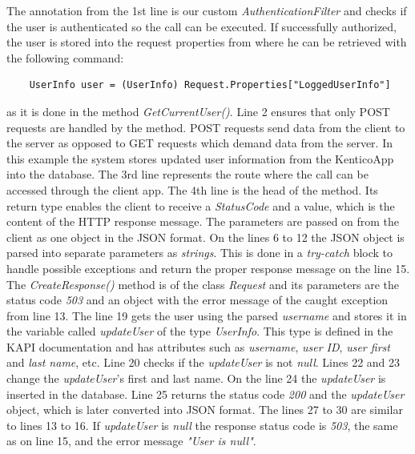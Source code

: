 The annotation from the 1st line is our custom \textit{AuthenticationFilter} and checks if the user is authenticated so the call can be executed. If successfully authorized, the user is stored into the request properties from where he can be retrieved with the following command:
\lstset{style=sharpc, numbers = none}
\begin{lstlisting}
	UserInfo user = (UserInfo) Request.Properties["LoggedUserInfo"]
\end{lstlisting}
as it is done in the method \textit{GetCurrentUser()}.
Line 2 ensures that only POST requests are handled by the method. POST requests send data from the client to the server as opposed to GET requests which demand data from the server. In this example the system stores updated user information from the KenticoApp into the database. The 3rd line represents the route where the call can be accessed through the client app. The 4th line is the head of the method. Its return type enables the client to receive a \textit{StatusCode} and a value, which is the content of the HTTP response message. The parameters are passed on from the client as one object in the JSON format. On the lines 6 to 12 the JSON object is parsed into separate parameters as \textit{strings}. This is done in a \textit{try-catch} block to handle possible exceptions and return the proper response message on the line 15. The \textit{CreateResponse()} method is of the class \textit{Request} and its parameters are the status code \textit{503} and an object with the error message of the caught exception from line 13. The line 19 gets the user using the parsed \textit{username} and stores it in the variable called \textit{updateUser} of the type \textit{UserInfo}. This type is defined in the KAPI documentation and has attributes such as \textit{username}, \textit{user ID}, \textit{user first} and \textit{last name}, etc. Line 20 checks if the \textit{updateUser} is not \textit{null}. Lines 22 and 23 change the \textit{updateUser}'s first and last name. On the line 24 the \textit{updateUser} is inserted in the database. Line 25 returns the status code \textit{200} and the \textit{updateUser} object, which is later converted into JSON format. The lines 27 to 30 are similar to lines 13 to 16. If \textit{updateUser} is \textit{null} the response status code is \textit{503}, the same as on line 15, and the error message \textit{"User is null"}. 

